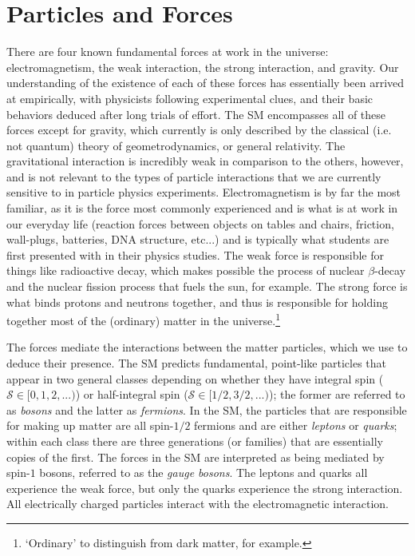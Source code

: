\section{Particles and Forces}
\label{sec:sm_description}

There are four known fundamental forces at work in the universe: electromagnetism,
the weak interaction, the strong interaction, and gravity.
Our understanding of the existence of each of these forces
has essentially been arrived at empirically, with physicists following experimental
clues, and their basic behaviors deduced after long trials of effort.
The SM encompasses all of these forces except for gravity, which currently
is only described by the classical (i.e. not quantum) theory of geometrodynamics, or general
relativity.
The gravitational interaction is incredibly weak in comparison to the others, however, and
is not relevant to the types of particle interactions that we are currently
sensitive to in particle physics experiments.
Electromagnetism is by far the most familiar, as it is the force
most commonly experienced and is what is at work in our everyday life (reaction forces between
objects on tables and chairs, friction, wall-plugs, batteries, DNA structure, etc...) and is typically what
students are first presented with in their physics studies.
The weak force is responsible for things like radioactive decay,
which makes possible the process of nuclear $\beta$-decay and the nuclear
fission process that fuels the sun, for example. The strong force is what binds protons
and neutrons together, and thus is responsible for holding together most of the (ordinary) matter
in the universe.\footnote{`Ordinary' to distinguish from dark matter, for example.}

The forces mediate the interactions between the matter particles, which we use to deduce
their presence. The SM predicts fundamental, point-like particles that appear in two
general classes depending on whether they have integral spin ($\mathcal{S} \in [0,1,2,...)$) or half-integral
spin ($\mathcal{S} \in [1/2, 3/2, ...)$); the former are referred to as \textit{bosons} and the
latter as \textit{fermions}.
In the SM, the particles that are responsible for making up matter are all spin-$1/2$ fermions
and are either \textit{leptons} or \textit{quarks}; within each class
there are three generations (or families) that are essentially copies of the first.
The forces in the SM are interpreted as being mediated by spin-$1$ bosons, referred to as the 
\textit{gauge bosons}.
The leptons and quarks all experience the weak force, but only the quarks experience
the strong interaction. All electrically charged particles interact with the electromagnetic
interaction.

